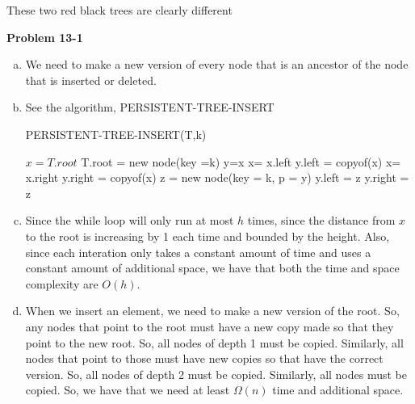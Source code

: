 \documentclass{article}
\begin{document}

These two red black trees are clearly different

\noindent\textbf{ Problem 13-1} \\
\begin{enumerate}[a.]
\item
We need to make a new version of every node that is an ancestor of the node that is inserted or deleted.

\item
See the algorithm, PERSISTENT-TREE-INSERT

\begin{algorithm}
\caption{PERSISTENT-TREE-INSERT(T,k)}
\begin{algorithmic}
\State $x = T.root$
\State T.root = new node(key =k)
\EndIf
{}
\State y=x
\State x=  x.left
\State y.left = copyof(x)
\Else
\State x= x.right
\State y.right = copyof(x)
\EndIf
\EndWhile
\State z = new node(key = k, p = y)
\State y.left = z
\Else
\State y.right = z
\EndIf
\end{algorithmic}
\end{algorithm}

\item
Since the while loop will only run at most $h$ times, since the distance from $x$ to the root is increasing by 1 each time and bounded by the height. Also, since each interation only takes a constant amount of time and uses a constant amount of additional space, we have that both the time and space complexity are $O(h)$.


\item
When we insert an element, we need to make a new version of the root. So, any nodes that point to the root must have a new copy made so that they point to the new root. So, all nodes of depth 1 must be copied. Similarly, all nodes that point to those must have new copies so that have the correct version. So, all nodes of depth 2 must be copied. Similarly, all nodes must be copied. So, we have that we need at least $\Omega(n)$ time and additional space.


\end{enumerate}
\end{document}
